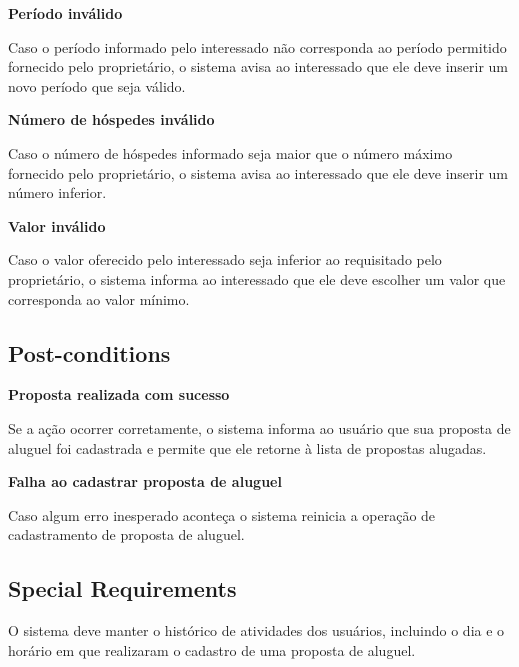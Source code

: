 \textbf{Período inválido}

Caso o período informado pelo interessado não corresponda ao período permitido fornecido
pelo proprietário, o sistema avisa ao interessado que ele deve inserir um novo período que
seja válido.

\textbf{Número de hóspedes inválido}

Caso o número de hóspedes informado seja maior que o número máximo fornecido pelo
proprietário, o sistema avisa ao interessado que ele deve inserir um número inferior.

\textbf{Valor inválido}

Caso o valor oferecido pelo interessado seja inferior ao requisitado pelo proprietário, o
sistema informa ao interessado que ele deve escolher um valor que corresponda ao valor
mínimo.

\subsection*{Post-conditions}

\textbf{Proposta realizada com sucesso}

Se a ação ocorrer corretamente, o sistema informa ao usuário que sua proposta de aluguel foi
cadastrada e permite que ele retorne à lista de propostas alugadas.

\textbf{Falha ao cadastrar proposta de aluguel}

Caso algum erro inesperado aconteça o sistema reinicia a operação de cadastramento de
proposta de aluguel.

\subsection*{Special Requirements} 
O sistema deve manter o histórico de atividades dos usuários, incluindo o dia e o horário em que
realizaram o cadastro de uma proposta de aluguel.